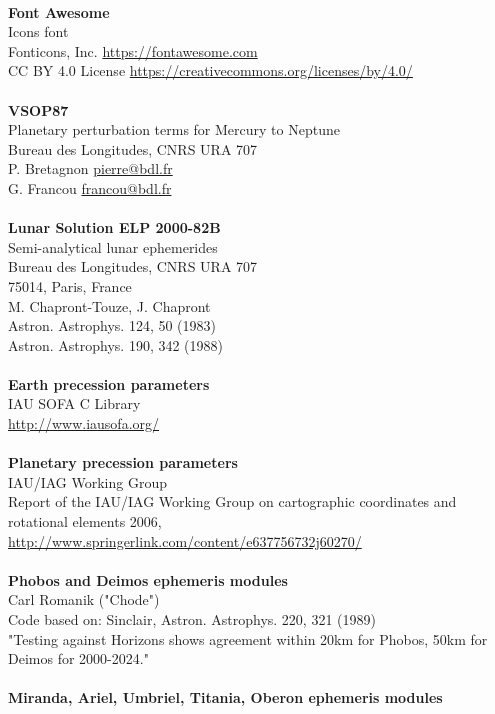 \documentclass[Orbiter User Manual.tex]{subfiles}
\begin{document}
\\
\textbf{Font Awesome}\\
Icons font\\
Fonticons, Inc. \url{https://fontawesome.com}\\
CC BY 4.0 License \url{https://creativecommons.org/licenses/by/4.0/}\\
\\
\textbf{VSOP87}\\
Planetary perturbation terms for Mercury to Neptune\\
Bureau des Longitudes, CNRS URA 707\\
P. Bretagnon \href{mailto:pierre@bdl.fr}{pierre@bdl.fr}\\
G. Francou \href{mailto:francou@bdl.fr}{francou@bdl.fr}\\
\\
\textbf{Lunar Solution ELP 2000-82B}\\
Semi-analytical lunar ephemerides\\
Bureau des Longitudes, CNRS URA 707\\
75014, Paris, France\\
M. Chapront-Touze, J. Chapront\\
Astron. Astrophys. 124, 50 (1983)\\
Astron. Astrophys. 190, 342 (1988)\\
\\
\textbf{Earth precession parameters}\\
IAU SOFA C Library\\
\url{http://www.iausofa.org/}\\
\\
\textbf{Planetary precession parameters}\\
IAU/IAG Working Group\\
Report of the IAU/IAG Working Group on cartographic coordinates and rotational elements 2006, \url{http://www.springerlink.com/content/e637756732j60270/}\\
\\
\textbf{Phobos and Deimos ephemeris modules}\\
Carl Romanik ("Chode")\\
Code based on: Sinclair, Astron. Astrophys. 220, 321 (1989)\\
"Testing against Horizons shows agreement within 20km for Phobos, 50km for Deimos for 2000-2024."\\
\\
\textbf{Miranda, Ariel, Umbriel, Titania, Oberon ephemeris modules}\\
\end{document}
